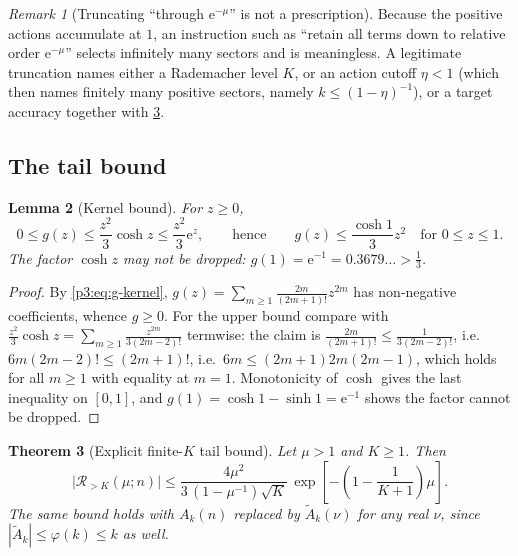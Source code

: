 \documentclass[11pt,a4paper,oneside]{book}
\theoremstyle{plain}
\newtheorem{theorem}{Theorem}[chapter]
\newtheorem{lemma}[theorem]{Lemma}
\theoremstyle{definition}
\theoremstyle{remark}
\newtheorem{remark}[theorem]{Remark}
\newcommand{\e}{\mathrm{e}}
\begin{document}
\begin{remark}[Truncating ``through $\e^{-\mu}$'' is not a prescription]
\label{p3:rem:no-eta-cutoff}
Because the positive actions accumulate at $1$, an instruction such as ``retain all terms down to
relative order $\e^{-\mu}$'' selects infinitely many sectors and is meaningless. A legitimate
truncation names either a Rademacher level $K$, or an action cutoff $\eta<1$ (which then names
finitely many positive sectors, namely $k\le(1-\eta)^{-1}$), or a target accuracy together with
\cref{p3:thm:tail}.
\end{remark}

\subsection{The tail bound}

\begin{lemma}[Kernel bound]\label{p3:lem:g-bound}
For $z\ge0$,
\begin{equation}\label{p3:eq:g-bound}
 0\le g(z)\le\frac{z^{2}}{3}\cosh z\le\frac{z^{2}}{3}\e^{z},
 \qquad\text{hence}\qquad
 g(z)\le\frac{\cosh 1}{3}z^{2}\quad\text{for }0\le z\le1 .
\end{equation}
The factor $\cosh z$ may not be dropped: $g(1)=\e^{-1}=0.3679\ldots>\tfrac13$.
\end{lemma}

\begin{proof}
By \cref{p3:eq:g-kernel}, $g(z)=\sum_{m\ge1}\frac{2m}{(2m+1)!}z^{2m}$ has non-negative
coefficients, whence $g\ge0$. For the upper bound compare with $\frac{z^{2}}{3}\cosh
z=\sum_{m\ge1}\frac{z^{2m}}{3(2m-2)!}$ termwise: the claim is
$\frac{2m}{(2m+1)!}\le\frac1{3(2m-2)!}$, i.e.\ $6m(2m-2)!\le(2m+1)!$, i.e.\ $6m\le(2m+1)2m(2m-1)$,
which holds for all $m\ge1$ with equality at $m=1$. Monotonicity of $\cosh$ gives the last
inequality on $[0,1]$, and $g(1)=\cosh1-\sinh1=\e^{-1}$ shows the factor cannot be dropped.
\end{proof}

\begin{theorem}[Explicit finite-$K$ tail bound]\label{p3:thm:tail}
Let $\mu>1$ and $K\ge1$. Then
\begin{equation}\label{p3:eq:tail}
 \bigl|\mathcal{R}_{>K}(\mu;n)\bigr|
 \le\frac{4\mu^{2}}{3\,(1-\mu^{-1})\sqrt K}\,
 \exp\!\left[-\left(1-\frac1{K+1}\right)\mu\right].
\end{equation}
The same bound holds with $A_{k}(n)$ replaced by $\widetilde A_{k}(\nu)$ for any real $\nu$, since
$|\widetilde A_{k}|\le\varphi(k)\le k$ as well.
\end{theorem}
\end{document}
